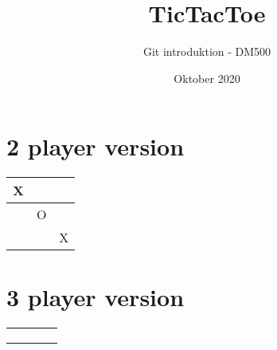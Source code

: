 \documentclass[20pt]{article}
\title{TicTacToe}
\author{Git introduktion - DM500}
\date{Oktober 2020}
\begin{document}
\maketitle

\section*{2 player version}

\setlength{\tabcolsep}{20pt}
\renewcommand{\arraystretch}{4}

\begin{table}[h]
\Large
    \centering
\begin{tabular}{ |m{2cm}|m{2cm}|m{2cm}|}
\hline

X  &   &   \\ \hline
  & O  &   \\ \hline
  &   &  X \\ \hline
\end{tabular}

\end{table}

\newpage

\section*{3 player version}

\setlength{\tabcolsep}{14pt}
\renewcommand{\arraystretch}{5}

\begin{table}[h]
\large
    \centering
\begin{tabular}{ |m{2cm}|m{2cm}|m{2cm}|m{2cm}|}
\hline
  &   &   &   \\ \hline
  &   &   &   \\ \hline
  &   &   &   \\ \hline
  &   &   &   \\ \hline

\end{tabular}

\end{table}
\end{document}
